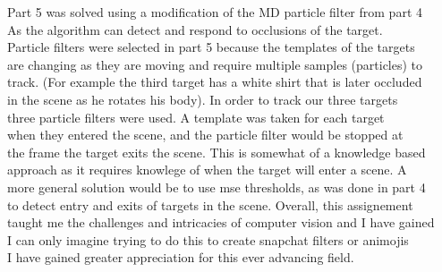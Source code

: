 Part 5 was solved using a modification of the MD particle filter from part 4\\
As the algorithm can detect and respond to occlusions of the target.\\
Particle filters were selected in part 5 because the templates of the targets\\
are changing as they are moving and require multiple samples (particles) to\\
track. (For example the third target has a white shirt that is later occluded\\
in the scene as he rotates his body). In order to track our three targets\\
three particle filters were used.  A template was taken for each target\\
when they entered the scene, and the particle filter would be stopped at \\
the frame the target exits the scene.  This is somewhat of a knowledge based\\
approach as it requires knowlege of when the target will enter a scene. A \\
more general solution would be to use mse thresholds, as was done in part 4\\
to detect entry and exits of targets in the scene.  Overall, this assignement\\
taught me the challenges and intricacies of computer vision and I have gained\\
I can only imagine trying to do this to create snapchat filters or animojis\\
I have gained greater appreciation for this ever advancing field.\\
